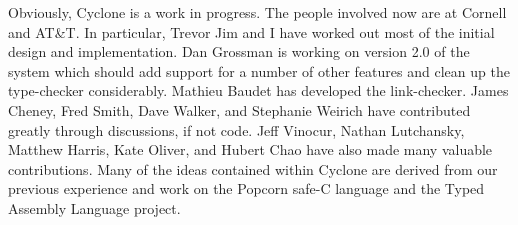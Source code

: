 Obviously, Cyclone is a work in progress. The people involved now are
at Cornell and AT\&T\@.  In particular, Trevor Jim and I have worked out
most of the initial design and implementation.  Dan Grossman is
working on version 2.0 of the system which should add support for a
number of other features and clean up the type-checker considerably.
Mathieu Baudet has developed the link-checker.  James Cheney, Fred
Smith, Dave Walker, and Stephanie Weirich have contributed greatly
through discussions, if not code.  Jeff Vinocur, Nathan Lutchansky,
Matthew Harris, Kate Oliver, and Hubert Chao have also made many
valuable contributions.  Many of the ideas contained within Cyclone
are derived from our previous experience and work on the Popcorn
safe-C language and the Typed Assembly Language project.

